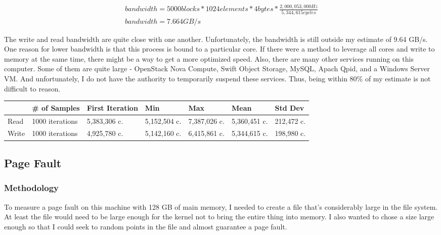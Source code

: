 \documentclass[paper=a4, fontsize=11pt]{scrartcl}
\numberwithin{equation}{section}        %
\numberwithin{figure}{section}          %
\numberwithin{table}{section}               %
\begin{document}
\begin{gather}
bandwidth = 5000 blocks * 1024 elements * 4 bytes * \frac{2,000,053,000 Hz}{5,344,615 cycles} \\
bandwidth = 7.664 GB/s
\end{gather}

The write and read bandwidth are quite close with one another.  Unfortunately, the bandwidth is still outside my estimate of 9.64 GB/s.  One reason for lower bandwidth is that this process is bound to a particular core.  If there were a method to leverage all cores and write to memory at the same time, there might be a way to get a more optimized speed.  Also, there are many other services running on this computer.  Some of them are quite large - OpenStack Nova Compute, Swift Object Storage, MySQL, Apach Qpid, and a Windows Server VM.  And unfortunately, I do not have the authority to temporarily suspend these services.  Thus, being within 80\% of my estimate is not difficult to reason.

\begin{center}
    \begin{tabular}{ | l | l | l | l | l | l | l |}
    \hline
     & \# of Samples & First Iteration & Min & Max & Mean & Std Dev \\
    \hline
    Read & 1000 iterations & 5,383,306 c. & 5,152,504 c. & 7,387,026 c. & 5,360,451 c. & 212,472 c. \\ 
    Write & 1000 iterations & 4,925,780 c. & 5,142,160 c. & 6,415,861 c. & 5,344,615 c. & 198,980 c. \\ 
    \hline
    \end{tabular}
\end{center}

\subsection{Page Fault}

\subsubsection{Methodology}

To measure a page fault on this machine with 128 GB of main memory, I needed to create a file that's considerably large in the file system.  At least the file would need to be large enough for the kernel not to bring the entire thing into memory.  I also wanted to chose a size large enough so that I could seek to random points in the file and almost guarantee a page fault.
\end{document}
